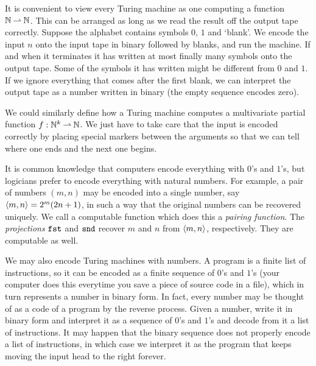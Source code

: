 It is convenient to view every Turing machine as one computing a
function $\mathbb{N} \mathbin{\rightharpoonup} \mathbb{N}$. This can be arranged as long as we read the
result off the output tape correctly. Suppose the alphabet contains
symbols $0$, $1$ and `blank'. We encode the input $n$ onto the input
tape in binary followed by blanks, and run the machine. If and when it
terminates it has written at most finally many symbols onto the output
tape. Some of the symbols it has written might be different from $0$
and $1$. If we ignore everything that comes after the first blank, we
can interpret the output tape as a number written in binary (the empty
sequence encodes zero).

We could similarly define how a Turing machine computes a multivariate
partial function $f : \mathbb{N}^k \mathbin{\rightharpoonup} \mathbb{N}$. We just have to take care
that the input is encoded correctly by placing special markers between
the arguments so that we can tell where one ends and the next one
begins.

It is common knowledge that computers encode everything with $0$'s and
$1$'s, but logicians prefer to encode everything with natural numbers.
For example, a pair of numbers $(m, n)$ may be encoded into a single
number, say $\langle m, n \rangle = 2^m (2 n + 1)$, in such a way that the
original numbers can be recovered uniquely. We call a computable
function which does this a \emph{pairing function}. The
\emph{projections} $\mathtt{fst}$ and $\mathtt{snd}$ recover $m$ and $n$ from
$\langle m, n \rangle$, respectively. They are computable as well.

We may also encode Turing machines with numbers. A program is a finite
list of instructions, so it can be encoded as a finite sequence of
$0$'s and $1$'s (your computer does this everytime you save a piece of
source code in a file), which in turn represents a number in binary
form. In fact, every number may be thought of as a code of a program
by the reverse process. Given a number, write it in binary form and
interpret it as a sequence of $0$'s and $1$'s and decode from it a
list of instructions. It may happen that the binary sequence does not
properly encode a list of instructions, in which case we interpret it
as the program that keeps moving the input head to the right forever.

